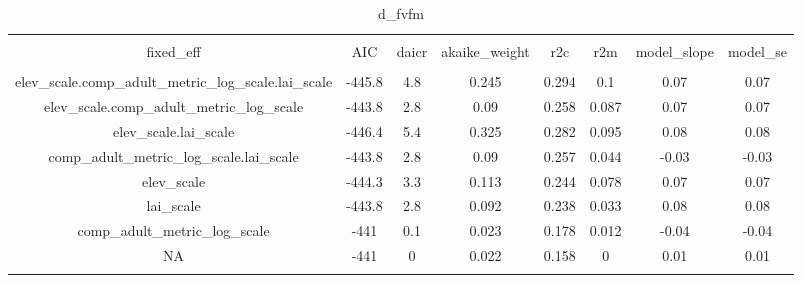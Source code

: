 
\begin{table}[!htbp] \centering 
  \caption{d_fvfm} 
  \label{d_fvfm} 
\begin{tabular}{@{\extracolsep{5pt}} cccccccc} 
\\[-1.8ex]\hline 
\hline \\[-1.8ex] 
fixed\_eff & AIC & daicr & akaike\_weight & r2c & r2m & model\_slope & model\_se \\ 
\hline \\[-1.8ex] 
elev\_scale.comp\_adult\_metric\_log\_scale.lai\_scale & -445.8 & 4.8 & 0.245 & 0.294 & 0.1 & 0.07 & 0.07 \\ 
elev\_scale.comp\_adult\_metric\_log\_scale & -443.8 & 2.8 & 0.09 & 0.258 & 0.087 & 0.07 & 0.07 \\ 
elev\_scale.lai\_scale & -446.4 & 5.4 & 0.325 & 0.282 & 0.095 & 0.08 & 0.08 \\ 
comp\_adult\_metric\_log\_scale.lai\_scale & -443.8 & 2.8 & 0.09 & 0.257 & 0.044 & -0.03 & -0.03 \\ 
elev\_scale & -444.3 & 3.3 & 0.113 & 0.244 & 0.078 & 0.07 & 0.07 \\ 
lai\_scale & -443.8 & 2.8 & 0.092 & 0.238 & 0.033 & 0.08 & 0.08 \\ 
comp\_adult\_metric\_log\_scale & -441 & 0.1 & 0.023 & 0.178 & 0.012 & -0.04 & -0.04 \\ 
NA & -441 & 0 & 0.022 & 0.158 & 0 & 0.01 & 0.01 \\ 
\hline \\[-1.8ex] 
\end{tabular} 
\end{table} 
